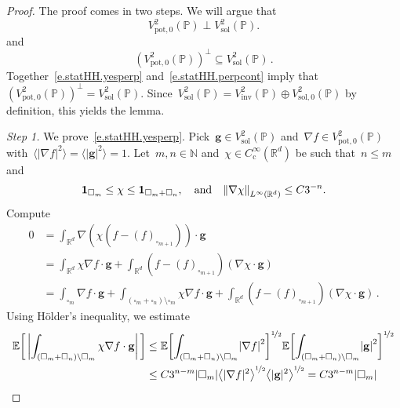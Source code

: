 \documentclass[11pt,twoside]{article} %
\let\oldsquare\square %
\renewcommand{\square}{\oldsquare}
\numberwithin{equation}{section}
\theoremstyle{definition}
\let\originalleft\left
\let\originalright\right
\renewcommand{\left}{\mathopen{}\mathclose\bgroup\originalleft}
\renewcommand{\right}{\aftergroup\egroup\originalright}
\newcommand*{\N}{\ensuremath{\mathbb{N}}}
\newcommand*{\Rd}{\ensuremath{\mathbb{R}^d}}
\renewcommand*{\tilde}{\widetilde}
\newcommand{\qand}{\quad \mbox{and} \quad }
\newcommand{\g}{\mathbf{g}}
\newcommand{\pot}{\mathrm{pot}}
\newcommand{\sol}{\mathrm{sol}}
\newcommand{\inv}{\mathrm{inv}}
\newcommand{\cu}{\square}
\renewcommand{\P}{\mathbb{P}}
\newcommand{\E}{\mathbb{E}}
\newcommand{\indc}{\boldsymbol{1}}
\def\Xint#1{\mathchoice
{\XXint\displaystyle\textstyle{#1}}%
{\XXint\textstyle\scriptstyle{#1}}%
{\XXint\scriptstyle\scriptscriptstyle{#1}}%
{\XXint\scriptscriptstyle\scriptscriptstyle{#1}}%
\!\int}
\def\XXint#1#2#3{{\setbox0=\hbox{$#1{#2#3}{\int}$}
\vcenter{\hbox{$#2#3$}}\kern-.5\wd0}}
\def\fint{\Xint-}
\begin{document}
\begin{proof}
The proof comes in two steps. 
We will argue that 
\begin{equation}
\label{e.statHH.yesperp}
V^2_{\pot,0}(\P) \perp V^2_\sol(\P).
\end{equation}
and
\begin{equation}
\label{e.statHH.perpcont}
(V^2_{\pot,0}(\P))^\perp \subseteq V^2_\sol(\P)
\,.
\end{equation}
Together~\eqref{e.statHH.yesperp} and~\eqref{e.statHH.perpcont} imply that~$(V^2_{\pot,0}(\P))^\perp = V^2_\sol(\P)$. Since~$V^2_\sol(\P) = V^2_{\inv}(\P) \oplus V^2_{\sol,0}(\P)$ by definition, this yields the lemma. 

\smallskip

\emph{Step 1.} We prove~\eqref{e.statHH.yesperp}. 
Pick~$\g\in V^2_{\sol}(\P)$ and~$\nabla f\in V^2_{\pot,0}(\P)$ with~$\langle |\nabla f|^2\rangle=\langle |\g|^2\rangle =1$. Let~$m,n\in\N$ and~$\chi \in C^\infty_{\mathrm{c}}(\Rd)$ be such that~$n\leq m$ and  
\begin{align*}
\indc_{\cu_m} \leq \chi \leq \indc_{\cu_m+\cu_n}, 
\qand
\left\| \nabla \chi \right\|_{L^\infty(\Rd)} 
\leq 
C3^{-n}.
\end{align*}
Compute 
\begin{align*}
0
&
=
\int_{\Rd} \nabla (\chi (f- (f)_{\cu_{m+1}} ) ) \cdot \g
\\ & 
=
\int_{\Rd} \chi \nabla f \cdot \g 
+
\int_{\Rd} 
(f- (f)_{\cu_{m+1}} ) (\nabla \chi \cdot \g )
\\ &
=
\int_{\cu_m} \nabla f \cdot \g 
+
\int_{(\cu_m+\cu_n)\setminus\cu_m}
\chi\nabla f \cdot \g
+
\int_{\Rd} 
 (f- (f)_{\cu_{m+1}} ) (\nabla \chi \cdot \g )
 \,.
\end{align*}
Using H\"older's inequality, we estimate
\begin{align*}
\E\biggl[ \,
\biggl| \int_{(\cu_m+\cu_n)\setminus\cu_m}
\chi\nabla f \cdot \g \biggr| \,
\biggr]
&
\leq 
\E\biggl[ 
\int_{(\cu_m+\cu_n)\setminus\cu_m}
\left| \nabla f \right|^2  \biggr]^{\nicefrac12} 
\E \biggl[ 
\int_{(\cu_m+\cu_n)\setminus\cu_m}
\left| \g \right|^2 \biggr]^{\nicefrac12}
\\ & 
\leq 
C 3^{n-m} |\cu_m|
\left\langle |\nabla f |^2\right\rangle^{\nicefrac12}
\left\langle |\g |^2\right\rangle^{\nicefrac12}
=
C3^{n-m} |\cu_m|
\end{align*}

\end{proof}
\end{document}
